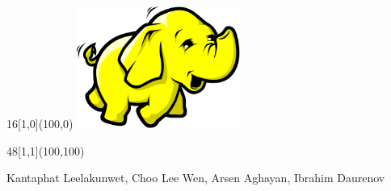 \documentclass{beamer}
\begin{document}
\begin{frame}
%
%

\begin{textblock}{16}[1,0](100,0)
	\logos[dark]\qquad\includegraphics[height=4cm]{img/ece472.pdf}
\end{textblock}



\begin{textblock}{48}[1,1](100,100)
    \begin{blankbox}[fontupper=\huge,colupper=black]
        Kantaphat Leelakunwet, Choo Lee Wen, Arsen Aghayan, Ibrahim Daurenov
    \end{blankbox}
\end{textblock}

\end{frame}
\end{document}
